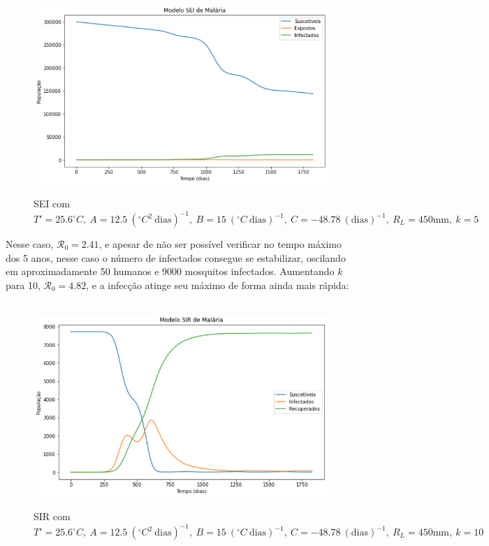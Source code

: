 \documentclass[12pt]{article}
\begin{document}
\begin{figure}[!ht]
        \centering
        \hbox{\hspace{3.2em} \includegraphics[scale=0.6] {Correcao_SEI_Desmat_k=5.png}}
        \caption{SEI com $T'=25.6 ^\circ C, \ A=12.5 \ (^\circ C^2 \ \text{dias})^{-1}, \ B=15 \ (^\circ C \ \text{dias})^{-1}, \ C=-48.78 \ (\text{dias})^{-1}, \ R_L=450 \text{mm}, \ k=5$}
\end{figure} 
\newpage
Nesse caso, $\mathcal{R}_0 = 2.41$, e apesar de não ser possível verificar no tempo 
máximo dos 5 anos, nesse caso o número de infectados consegue se estabilizar, 
oscilando em aproximadamente 50 humanos e 9000 mosquitos infectados. Aumentando $k$ para 10, 
$\mathcal{R}_0 = 4.82$, e a infecção atinge seu máximo de forma ainda mais rápida:
\begin{figure}[!ht]
        \centering
        \hbox{\hspace{4.2em} \includegraphics[scale=0.6] {Correcao_SIR_Desmat_k=10.png}}
        \caption{SIR com $T'=25.6 ^\circ C, \ A=12.5 \ (^\circ C^2 \ \text{dias})^{-1}, \ B=15 \ (^\circ C \ \text{dias})^{-1}, \ C=-48.78 \ (\text{dias})^{-1}, \ R_L=450 \text{mm}, \ k=10$}
\end{figure} 
\end{document}

